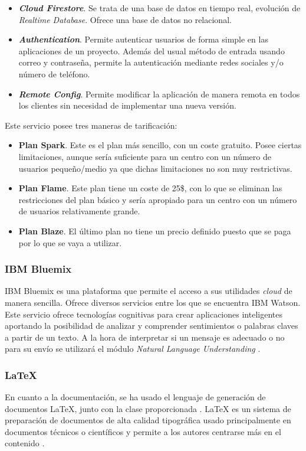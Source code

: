\begin{itemize}
	\item \textbf{\textit{Cloud Firestore}}. Se trata de una base de datos en tiempo real, evolución de \textit{Realtime Database}. Ofrece una base de datos no relacional.
	\item \textbf{\textit{Authentication}}. Permite autenticar usuarios de forma simple en las aplicaciones de un proyecto. Además del usual método de entrada usando correo y contraseña, permite la autenticación mediante redes sociales y/o número de teléfono.
	\item \textbf{\textit{Remote Config}}. Permite modificar la aplicación de manera remota en todos los clientes sin necesidad de implementar una nueva versión.
\end{itemize}

Este servicio posee tres maneras de tarificación:

\begin{itemize}
	\item \textbf{Plan Spark}. Este es el plan más sencillo, con un coste gratuito. Posee ciertas limitaciones, aunque sería suficiente para un centro con un número de usuarios pequeño/medio ya que dichas limitaciones no son muy restrictivas.
	\item \textbf{Plan Flame}. Este plan tiene un coste de 25\$, con lo que se eliminan las restricciones del plan básico y sería apropiado para un centro con un número de usuarios relativamente grande.
	\item \textbf{Plan Blaze}. El último plan no tiene un precio definido puesto que se paga por lo que se vaya a utilizar.
\end{itemize}

\subsubsection*{IBM Bluemix}
IBM Bluemix es una plataforma que permite el acceso a sus utilidades \textit{cloud} de manera sencilla. Ofrece diversos servicios entre los que se encuentra IBM Watson. Este servicio ofrece tecnologías cognitivas para crear aplicaciones inteligentes aportando la posibilidad de analizar y comprender sentimientos o palabras claves a partir de un texto. A la hora de interpretar si un mensaje es adecuado o no para su envío se utilizará el módulo \textit{Natural Language Understanding} \cite{IBM}.

\subsubsection*{LaTeX}
En cuanto a la documentación, se ha usado el lenguaje de generación de documentos \LaTeX{}, junto con la clase \esitfg{} proporcionada \cite{ARCO}. \LaTeX{} es un sistema de preparación de documentos de alta calidad tipográfica usado principalmente en documentos técnicos o científicos y permite a los autores centrarse más en el contenido \cite{TheLatexProject}.